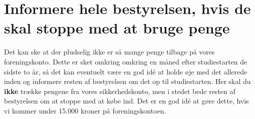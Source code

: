 \section{Informere hele bestyrelsen, hvis de skal stoppe med at bruge penge}
Det kan ske at der pludselig ikke er så mange penge tilbage på vores foreningskonto. Dette er sket omkring omkring en måned efter studiestarten de sidste to år, så det kan eventuelt være en god idé at holde øje med det allerede inden og informere resten af bestyrelsen om det op til studiestarten. Her skal du \textbf{ikke} trække pengene fra vores sikkerhedskonto, men i stedet bede resten af bestyrelsen om at stoppe med at købe ind. Det er en god idé at gøre dette, hvis vi kommer under 15.000 kroner på foreningskontoen.

